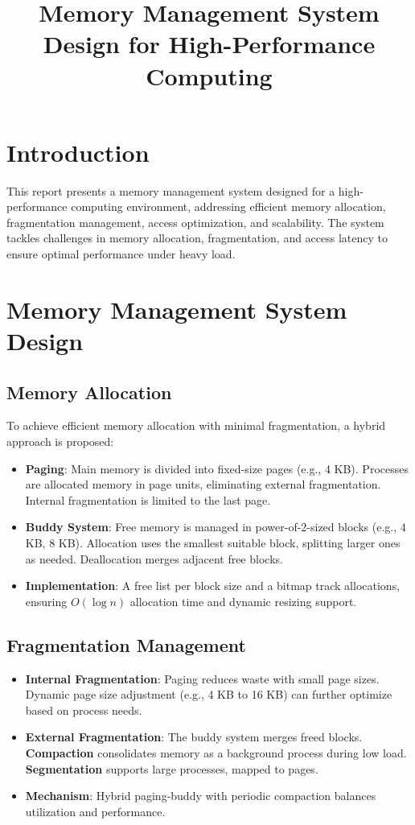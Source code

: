 \documentclass[a4paper,12pt]{article}
\title{Memory Management System Design for High-Performance Computing}
\author{}
\date{}
\begin{document}
\maketitle

\section*{Introduction}
This report presents a memory management system designed for a high-performance computing environment, addressing efficient memory allocation, fragmentation management, access optimization, and scalability. The system tackles challenges in memory allocation, fragmentation, and access latency to ensure optimal performance under heavy load.

\section{Memory Management System Design}

\subsection{Memory Allocation}
To achieve efficient memory allocation with minimal fragmentation, a hybrid approach is proposed:
\begin{itemize}
    \item \textbf{Paging}: Main memory is divided into fixed-size pages (e.g., 4 KB). Processes are allocated memory in page units, eliminating external fragmentation. Internal fragmentation is limited to the last page.
    \item \textbf{Buddy System}: Free memory is managed in power-of-2-sized blocks (e.g., 4 KB, 8 KB). Allocation uses the smallest suitable block, splitting larger ones as needed. Deallocation merges adjacent free blocks.
    \item \textbf{Implementation}: A free list per block size and a bitmap track allocations, ensuring $O(\log n)$ allocation time and dynamic resizing support.
\end{itemize}

\subsection{Fragmentation Management}
\begin{itemize}
    \item \textbf{Internal Fragmentation}: Paging reduces waste with small page sizes. Dynamic page size adjustment (e.g., 4 KB to 16 KB) can further optimize based on process needs.
    \item \textbf{External Fragmentation}: The buddy system merges freed blocks. \textbf{Compaction} consolidates memory as a background process during low load. \textbf{Segmentation} supports large processes, mapped to pages.
    \item \textbf{Mechanism}: Hybrid paging-buddy with periodic compaction balances utilization and performance.
\end{itemize}
\end{document}
